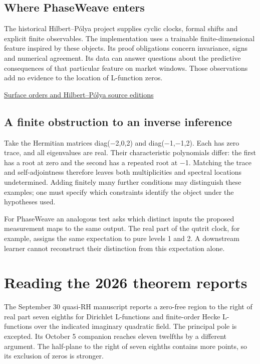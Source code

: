 \documentclass[11pt,oneside,openany]{book}
\begin{document}
\section*{Where PhaseWeave enters}
The historical Hilbert–Pólya project supplies cyclic clocks, formal shifts and explicit finite observables. The implementation uses a trainable finite-dimensional feature inspired by these objects. Its proof obligations concern invariance, signs and numerical agreement. Its data can answer questions about the predictive consequences of that particular feature on market windows. Those observations add no evidence to the location of L-function zeros.

{\small\sffamily\href{https://github.com/amelie-iska/Surface-Orders-Hilbert-Polya}{Surface orders and Hilbert–Pólya source editions}\par}
\section*{A finite obstruction to an inverse inference}
Take the Hermitian matrices diag(\ensuremath{-}2,0,2) and diag(\ensuremath{-}1,\ensuremath{-}1,2). Each has zero trace, and all eigenvalues are real. Their characteristic polynomials differ: the first has a root at zero and the second has a repeated root at \ensuremath{-}1. Matching the trace and self-adjointness therefore leaves both multiplicities and spectral locations undetermined. Adding finitely many further conditions may distinguish these examples; one must specify which constraints identify the object under the hypotheses used.

For PhaseWeave an analogous test asks which distinct inputs the proposed measurement maps to the same output. The real part of the qutrit clock, for example, assigns the same expectation to pure levels 1 and 2. A downstream learner cannot reconstruct their distinction from this expectation alone.

\chapter{Reading the 2026 theorem reports}
The September 30 quasi-RH manuscript reports a zero-free region to the right of real part seven eighths for Dirichlet L-functions and finite-order Hecke L-functions over the indicated imaginary quadratic field. The principal pole is excepted. Its October 5 companion reaches eleven twelfths by a different argument. The half-plane to the right of seven eighths contains more points, so its exclusion of zeros is stronger.
\end{document}
